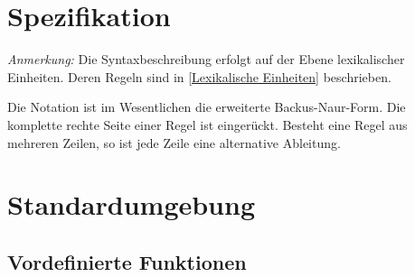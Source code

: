 
\newpage
\section{Spezifikation}

\emph{Anmerkung:} 
Die Syntaxbeschreibung erfolgt auf der Ebene lexikalischer Einheiten. 
Deren Regeln sind in \ref{Lexikalische Einheiten} beschrieben. 

\newcommand\Gspace{\ \ }
\newcommand\Gnt[1]{\emph{#1}}
\newcommand\Gt[1]{`\texttt{#1}'}
\newcommand\Gspecial[1]{#1}
\newcommand\Grange[2]{\Gt{#1} .. \Gt{#2}}
\newcommand\Gopt[1]{[\ #1\ ]}
\newcommand\Galt[1]{( #1 )}
\newcommand\Gor{ | }
\newcommand\Gclosure[1]{\{ #1 \}}
\newcommand\attr[1]{\texttt{#1}}
\newcommand\kw[1]{\texttt{#1}}
\newcommand\op[1]{`\texttt{#1}'}
\newcommand\pmbr[1]{\texttt{#1}}
\newcommand\ident[1]{\texttt{#1}}
\newcommand\plus{+}
\newcommand\kwMlcStart{\kw{/*}}
\newcommand\kwMlcEnd{\kw{*/}}

Die Notation ist im Wesentlichen die erweiterte Backus-Naur-Form.
Die komplette rechte Seite einer Regel ist eingerückt. Besteht eine Regel
aus mehreren Zeilen, so ist jede Zeile eine alternative Ableitung.



\section{Standardumgebung}

\subsection{Vordefinierte Funktionen}
\label{builtins}

